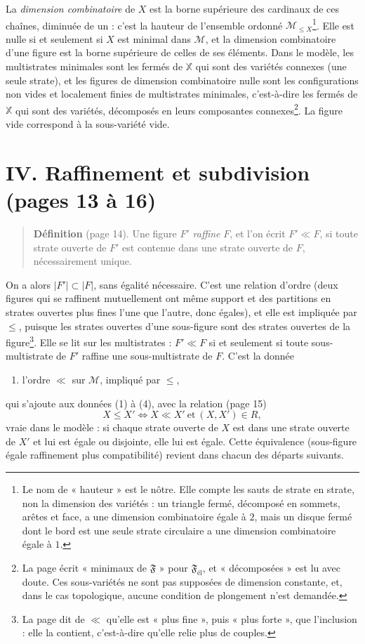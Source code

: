 \documentclass[11pt,a4paper]{article}
\begin{document}
La \emph{dimension combinatoire} de $X$ est la borne supérieure des cardinaux
de ces chaînes, diminuée de un : c'est la hauteur de l'ensemble ordonné
$\mathcal{M}_{\leq X}$\footnote{Le nom de « hauteur » est le nôtre. Elle
compte les sauts de strate en strate, non la dimension des variétés : un
triangle fermé, décomposé en sommets, arêtes et face, a une dimension
combinatoire égale à $2$, mais un disque fermé dont le bord est une seule
strate circulaire a une dimension combinatoire égale à $1$.}. Elle est nulle
si et seulement si $X$ est minimal dans $\mathcal{M}$, et la dimension
combinatoire d'une figure est la borne supérieure de celles de ses éléments.
Dans le modèle, les multistrates minimales sont les fermés de $\mathbb{X}$ qui
sont des variétés connexes (une seule strate), et les figures de dimension
combinatoire nulle sont les configurations non vides et localement finies de
multistrates minimales, c'est-à-dire les fermés de $\mathbb{X}$ qui sont des
variétés, décomposés en leurs composantes connexes\footnote{La page écrit
« minimaux de $\mathfrak{F}$ » pour $\mathfrak{F}_{\text{él}}$, et
« décomposées » est lu avec doute. Ces sous-variétés ne sont pas supposées de
dimension constante, et, dans le cas topologique, aucune condition de
plongement n'est demandée.}. La figure vide correspond à la sous-variété
vide.

\section*{IV. Raffinement et subdivision (pages 13 à 16)}

\begin{quote}
\textbf{Définition} (page 14). Une figure $F'$ \emph{raffine} $F$, et l'on
écrit $F' \ll F$, si toute strate ouverte de $F'$ est contenue dans une strate
ouverte de $F$, nécessairement unique.
\end{quote}

On a alors $|F'| \subset |F|$, sans égalité nécessaire. C'est une relation
d'ordre (deux figures qui se raffinent mutuellement ont même support et des
partitions en strates ouvertes plus fines l'une que l'autre, donc égales),
et elle est impliquée par $\leq$, puisque les strates ouvertes d'une
sous-figure sont des strates ouvertes de la figure\footnote{La page dit de
$\ll$ qu'elle est « plus fine », puis « plus forte », que l'inclusion : elle
la contient, c'est-à-dire qu'elle relie plus de couples.}. Elle se lit sur les
multistrates : $F' \ll F$ si et seulement si toute sous-multistrate de $F'$
raffine une sous-multistrate de $F$. C'est la donnée
\begin{enumerate}
\item[(5)] l'ordre $\ll$ sur $\mathcal{M}$, impliqué par $\leq$,
\end{enumerate}
qui s'ajoute aux données (1) à (4), avec la relation (page 15)
\[
X \leq X' \iff X \ll X' \ \text{et}\ (X, X') \in R ,
\]
vraie dans le modèle : si chaque strate ouverte de $X$ est dans une strate
ouverte de $X'$ et lui est égale ou disjointe, elle lui est égale. Cette
équivalence (sous-figure égale raffinement plus compatibilité) revient
dans chacun des départs suivants.
\end{document}
